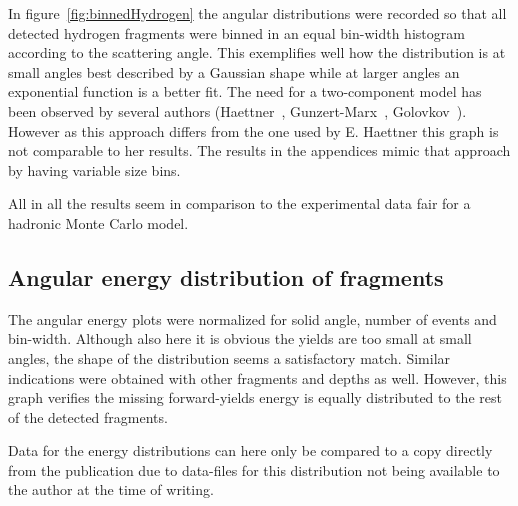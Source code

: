 In figure~\ref{fig:binnedHydrogen} the angular distributions were recorded so that all detected hydrogen fragments were binned in an equal bin-width histogram according to the scattering angle. This exemplifies well how the distribution is at small angles best described by a Gaussian shape while at larger angles an exponential function is a better fit. The need for a two-component model has been observed by several authors (Haettner~\cite{ehaettner}, Gunzert-Marx~\cite{gunzert-marx}, Golovkov~\cite{golovkov}). However as this approach differs from the one used by E. Haettner this graph is not comparable to her results. The results in the appendices mimic that approach by having variable size bins.

All in all the results seem in comparison to the experimental data fair for a hadronic Monte Carlo model.

\subsection{Angular energy distribution of fragments}
The angular energy plots were normalized for solid angle, number of events and bin-width. Although also here it is obvious the yields are too small at small angles, the shape of the distribution seems a satisfactory match. Similar indications were obtained with other fragments and depths as well. However, this graph verifies the missing forward-yields energy is equally distributed to the rest of the detected fragments.

Data for the energy distributions can here only be compared to a copy directly from the publication due to data-files for this distribution not being available to the author at the time of writing.


